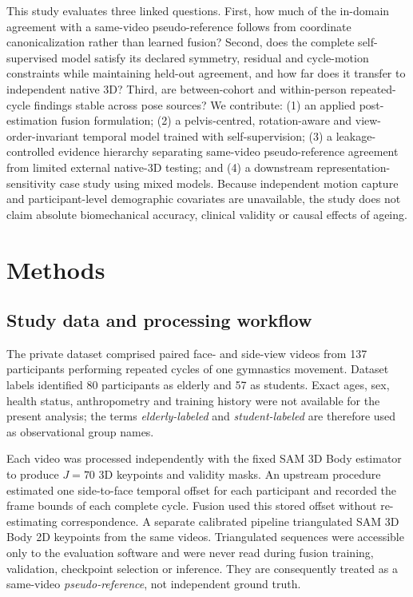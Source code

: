 \documentclass[lineno,pdflatex,sn-mathphys-num]{sn-jnl}
\begin{document}
This study evaluates three linked questions. First, how much of the in-domain
agreement with a same-video pseudo-reference follows from coordinate
canonicalization rather than learned fusion? Second, does the complete
self-supervised model satisfy its declared symmetry, residual and cycle-motion
constraints while maintaining held-out agreement, and how far does it transfer
to independent native 3D? Third, are between-cohort and within-person
repeated-cycle findings stable across pose sources? We contribute: (1) an
applied post-estimation fusion formulation; (2) a pelvis-centred,
rotation-aware and view-order-invariant temporal model trained with
self-supervision; (3) a leakage-controlled evidence hierarchy separating
same-video pseudo-reference agreement from limited external native-3D testing;
and (4) a downstream representation-sensitivity case study using mixed models.
Because independent motion capture and participant-level demographic covariates
are unavailable, the study does not claim absolute biomechanical accuracy,
clinical validity or causal effects of ageing.

\section{Methods}\label{sec:methods}

\subsection{Study data and processing workflow}

The private dataset comprised paired face- and side-view videos from 137
participants performing repeated cycles of one gymnastics movement. Dataset
labels identified 80 participants as elderly and 57 as students. Exact ages,
sex, health status, anthropometry and training history were not available for
the present analysis; the terms \emph{elderly-labeled} and
\emph{student-labeled} are therefore used as observational group names.

Each video was processed independently with the fixed SAM 3D Body estimator to
produce $J=70$ 3D keypoints and validity masks. An upstream procedure estimated
one side-to-face temporal offset for each participant and recorded the frame
bounds of each complete cycle. Fusion used this stored offset without
re-estimating correspondence. A separate calibrated pipeline triangulated
SAM 3D Body 2D keypoints from the same videos. Triangulated sequences were
accessible only to the evaluation software and were never read during fusion
training, validation, checkpoint selection or inference. They are consequently
treated as a same-video \emph{pseudo-reference}, not independent ground truth.
\end{document}
